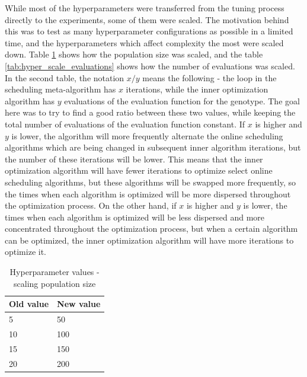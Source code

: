 While most of the hyperparameters were transferred from the tuning process directly to the experiments, some of them were scaled. The motivation behind this was to test as many hyperparameter configurations as possible in a limited time, and the hyperparameters which affect complexity the most were scaled down. Table \ref{tab:hyper_scale_population} shows how the population size was scaled, and the table \ref{tab:hyper_scale_evaluations} shows how the number of evaluations was scaled. In the second table, the notation $x/y$ means the following - the loop in the scheduling meta-algorithm has $x$ iterations, while the inner optimization algorithm has $y$ evaluations of the evaluation function for the genotype. The goal here was to try to find a good ratio between these two values, while keeping the total number of evaluations of the evaluation function constant. If $x$ is higher and $y$ is lower, the algorithm will more frequently alternate the online scheduling algorithms which are being changed in subsequent inner algorithm iterations, but the number of these iterations will be lower. This means that the inner optimization algorithm will have fewer iterations to optimize select online scheduling algorithms, but these algorithms will be swapped more frequently, so the times when each algorithm is optimized will be more dispersed throughout the optimization process. On the other hand, if $x$ is higher and $y$ is lower, the times when each algorithm is optimized will be less dispersed and more concentrated throughout the optimization process, but when a certain algorithm can be optimized, the inner optimization algorithm will have more iterations to optimize it.

\begin{table}[!htbp]
    \begin{center}
        \begin{tabular}{|l|l|} 
         \hline
            Old value & New value \\ [0.5ex] \hline\hline
            5 & 50 \\
            \hline
            10 & 100 \\
            \hline
            15 & 150 \\
            \hline
            20 & 200 \\
            \hline
        \end{tabular}
    \end{center}
    \caption{Hyperparameter values - scaling population size}
\label{tab:hyper_scale_population}
\end{table}

